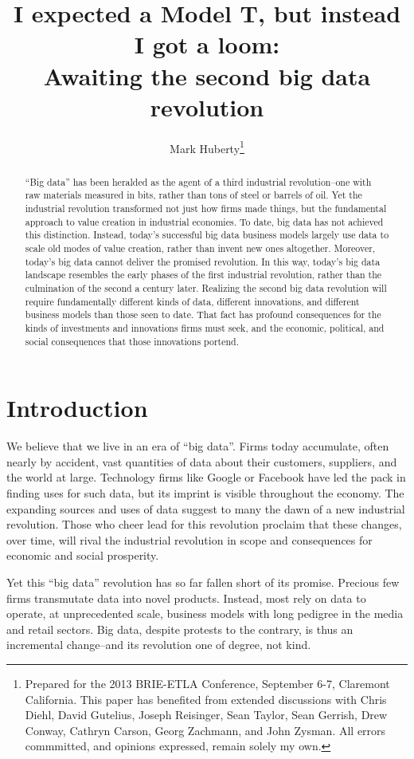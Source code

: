 \documentclass[12pt]{article}
\title{I expected a Model T, but instead I got a loom:\\ Awaiting the second big data revolution}
\author{Mark Huberty\thanks{Prepared for the 2013 BRIE-ETLA
    Conference, September 6-7, Claremont California. This paper has
    benefited from extended discussions with Chris Diehl, David
    Gutelius, Joseph Reisinger, Sean Taylor, Sean Gerrish, Drew
    Conway, Cathryn Carson, Georg Zachmann, and John
    Zysman. All errors commmitted, and opinions expressed, remain
    solely my own.}}
\begin{document}
\maketitle
\begin{abstract}
``Big data'' has been heralded as the agent of a third industrial
revolution--one with raw materials measured in bits, rather than tons
of steel or barrels of oil. Yet the industrial revolution transformed not just how
firms made things, but the fundamental approach to value creation in
industrial economies. To date, big data has not achieved this
distinction. Instead, today's successful big data business models
largely use data to scale old modes of value creation, rather than
invent new ones altogether. Moreover, today's big data cannot deliver
the promised revolution. In this way, today's big data landscape
resembles the early phases of the first industrial revolution, rather
than the culmination of the second a century later. Realizing the
second big data revolution will require fundamentally different kinds
of data, different innovations, and different business models than
those seen to date. That fact has profound consequences for the kinds
of investments and innovations firms must seek, and the economic,
political, and social consequences that those innovations portend.
\end{abstract}


\section{Introduction}
\label{sec:introduction}

We believe that we live in an era of ``big data''. Firms today
accumulate, often nearly by accident, vast quantities of data about
their customers, suppliers, and the world at large. Technology firms
like Google or Facebook have led the pack in finding uses for such
data, but its imprint is visible throughout the economy. The expanding
sources and uses of data suggest to many the dawn of a new industrial
revolution. Those who cheer lead for this revolution proclaim that
these changes, over time, will rival the industrial revolution in
scope and consequences for economic and social prosperity.

Yet this ``big data'' revolution has so far fallen short of its
promise. Precious few firms transmutate data into novel
products. Instead, most rely on data to operate, at unprecedented
scale, business models with long pedigree in the media and retail
sectors. Big data, despite protests to the contrary, is thus an
incremental change--and its revolution one of degree, not kind. 
\end{document}
